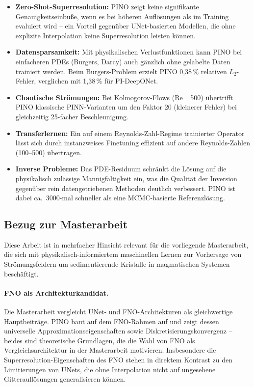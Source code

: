 \documentclass[a4paper,12pt]{article}
\begin{document}
\begin{itemize}
    \item \textbf{Zero-Shot-Superresolution:} PINO zeigt keine signifikante
    Genauigkeitseinbuße, wenn es bei höheren Auflösungen als im Training evaluiert
    wird -- ein Vorteil gegenüber UNet-basierten Modellen, die ohne explizite
    Interpolation keine Superresolution leisten können.

    \item \textbf{Datensparsamkeit:} Mit physikalischen Verlustfunktionen kann PINO
    bei einfacheren PDEs (Burgers, Darcy) auch gänzlich ohne gelabelte Daten trainiert
    werden. Beim Burgers-Problem erzielt PINO 0,38\,\% relativen $L_2$-Fehler,
    verglichen mit 1,38\,\% für PI-DeepONet.

    \item \textbf{Chaotische Strömungen:} Bei Kolmogorov-Flows (Re\,=\,500) übertrifft
    PINO klassische PINN-Varianten um den Faktor 20 (kleinerer Fehler) bei gleichzeitig
    25-facher Beschleunigung.

    \item \textbf{Transferlernen:} Ein auf einem Reynolds-Zahl-Regime trainierter Operator
    lässt sich durch instanzweises Finetuning effizient auf andere Reynolds-Zahlen
    (100--500) übertragen.

    \item \textbf{Inverse Probleme:} Das PDE-Residuum schränkt die Lösung auf die
    physikalisch zulässige Mannigfaltigkeit ein, was die Qualität der Inversion
    gegenüber rein datengetriebenen Methoden deutlich verbessert. PINO ist dabei
    ca.\ 3000-mal schneller als eine MCMC-basierte Referenzlösung.
\end{itemize}

\subsection*{Bezug zur Masterarbeit}

Diese Arbeit ist in mehrfacher Hinsicht relevant für die vorliegende Masterarbeit, die
sich mit physikalisch-informiertem maschinellen Lernen zur Vorhersage von Strömungsfeldern
um sedimentierende Kristalle in magmatischen Systemen beschäftigt.

\paragraph{FNO als Architekturkandidat.}
Die Masterarbeit vergleicht UNet- und FNO-Architekturen als gleichwertige Hauptbeiträge.
PINO baut auf dem FNO-Rahmen auf und zeigt dessen universelle Approximationseigenschaften
sowie Diskretisierungskonvergenz -- beides sind theoretische Grundlagen, die die Wahl von
FNO als Vergleichsarchitektur in der Masterarbeit motivieren. Insbesondere die
Superresolution-Eigenschaften des FNO stehen in direktem Kontrast zu den Limitierungen
von UNets, die ohne Interpolation nicht auf ungesehene Gitterauflösungen generalisieren
können.
\end{document}
